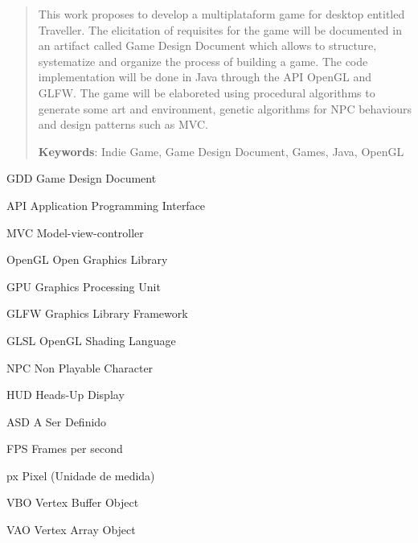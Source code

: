 \documentclass[12pt, 
openright, 
oneside, 
a4paper,    
brazil]{facom-ufu-abntex2}
\begin{document}
\begin{abstract} 
This work proposes to develop a multiplataform game for desktop entitled Traveller. The elicitation of requisites for the game will be documented in an artifact called Game Design Document which allows to structure, systematize and organize the process of building a game. The code implementation will be done in Java through the API OpenGL and GLFW.  The game will be elaboreted using procedural algorithms to generate some art and environment, genetic algorithms for NPC behaviours and design patterns such as MVC.

 \vspace{\onelineskip}
    
 \noindent
 \textbf{Keywords}: Indie Game, Game Design Document, Games, Java, OpenGL %
\end{abstract}
\cleardoublepage


\listoffigures*
\cleardoublepage


\listoftables*
\cleardoublepage

\lstlistoflistings
\cleardoublepage


\begin{siglas} 
  \item[GDD] Game Design Document 
  \item[API] Application Programming Interface
  \item[MVC] Model-view-controller
  \item[OpenGL] Open Graphics Library
  \item[GPU] Graphics Processing Unit
  \item[GLFW] Graphics Library Framework
  \item[GLSL] OpenGL Shading Language
  \item[NPC] Non Playable Character
  \item[HUD] Heads-Up Display
  \item[ASD] A Ser Definido
  \item[FPS] Frames per second
  \item[px] Pixel (Unidade de medida)
  \item[VBO] Vertex Buffer Object
  \item[VAO] Vertex Array Object
\end{siglas}
\end{document}
